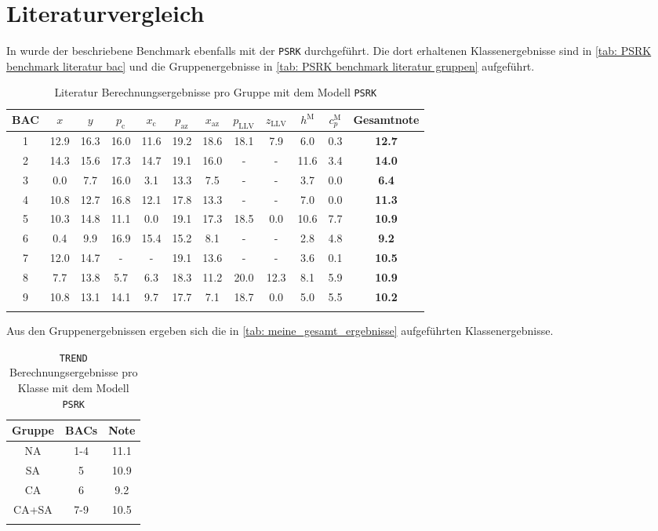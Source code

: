 \documentclass[../thesis.tex]{subfiles}
\begin{document}
\section{Literaturvergleich}

In \cite{bibid} wurde der beschriebene Benchmark ebenfalls mit der \texttt{PSRK} durchgeführt. Die dort erhaltenen Klassenergebnisse sind in \autoref{tab: PSRK benchmark literatur bac} und die Gruppenergebnisse in \autoref{tab: PSRK benchmark literatur gruppen} aufgeführt.

\begin{table} [htb]
	\centering
	\caption{Literatur Berechnungsergebnisse pro Gruppe mit dem Modell \texttt{PSRK}}
	\begin{tabular}{ cccccccccccc }
		\hline
		BAC & $ x $ & $ y $ & $ p_\mathrm{c}$ & $ x_\mathrm{c}$ & $ p_\mathrm{az}$ & $ x_\mathrm{az}$ & $ p_\mathrm{LLV}$ & $ z_\mathrm{LLV}$ & $ h^\mathrm{M} $ & $ c_p^\mathrm{M} $ & \textbf{Gesamtnote} \\
		\hline
		1 & 12.9 & 16.3 & 16.0  & 11.6  & 19.2  & 18.6 & 18.1 & 7.9  & 6.0  & 0.3 & \textbf{12.7}\\
		2 & 14.3 & 15.6 & 17.3  & 14.7  & 19.1  & 16.0 & -    & -    & 11.6 & 3.4 & \textbf{14.0}\\
		3 & 0.0  & 7.7  & 16.0  & 3.1   & 13.3  & 7.5  & -    & -    & 3.7  & 0.0 & \textbf{6.4}\\
		4 & 10.8 & 12.7 & 16.8  & 12.1  & 17.8  & 13.3 & -    & -    & 7.0  & 0.0 & \textbf{11.3}\\
		5 & 10.3 & 14.8 & 11.1  & 0.0   & 19.1  & 17.3 & 18.5 & 0.0  & 10.6 & 7.7 & \textbf{10.9}\\
		6 & 0.4  & 9.9  & 16.9  & 15.4  & 15.2  & 8.1  & -    & -    & 2.8  & 4.8 & \textbf{9.2}\\
		7 & 12.0 & 14.7 & -     & -     & 19.1  & 13.6 & -    & -    & 3.6  & 0.1 & \textbf{10.5}\\
		8 & 7.7  & 13.8 & 5.7   & 6.3   & 18.3  & 11.2 & 20.0 & 12.3 & 8.1  & 5.9 & \textbf{10.9}\\
		9 & 10.8 & 13.1 & 14.1  & 9.7   & 17.7  & 7.1  & 18.7 & 0.0  & 5.0  & 5.5 & \textbf{10.2}\\
		\hline
		\label{tab: PSRK benchmark literatur bac}
	\end{tabular}
\end{table}

Aus den Gruppenergebnissen ergeben sich die in \autoref{tab: meine_gesamt_ergebnisse} aufgeführten Klassenergebnisse.

\begin{table} [htb]
	\centering
	\caption{\texttt{TREND} Berechnungsergebnisse pro Klasse mit dem Modell \texttt{PSRK}}
	\begin{tabular}{ ccc }
		\hline
		Gruppe & BACs & Note  \\
		\hline
		NA & 1-4 & 11.1 \\
		SA & 5   & 10.9 \\
		CA & 6   & 9.2 \\
		CA+SA & 7-9 & 10.5 \\ 
		\hline
		\label{tab: PSRK benchmark literatur gruppen}
	\end{tabular}
\end{table}
\end{document}
